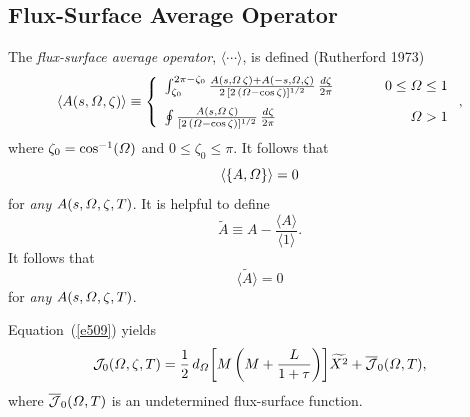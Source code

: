 \documentclass[notitlepage,12pt]{article}
\begin{document}
\subsection{Flux-Surface Average Operator}
The {\em flux-surface average operator}, $\langle\cdots\rangle$, is defined (Rutherford 1973)
\begin{equation}
\langle A(s,{\mit\Omega},\zeta)\rangle
\equiv \left\{
\begin{array}{llr}
\int_{\zeta_0}^{2\pi-\zeta_0}\frac{A(s,{\mit\Omega}\,\zeta)+A(-s,{\mit\Omega},\zeta)}{2\,[2\,({\mit\Omega}-\cos\zeta)]^{1/2}}\,\frac{d\zeta}{2\pi}&~~~~~&0\leq {\mit\Omega}\leq 1\\[2ex]
\oint \frac{A(s,{\mit\Omega}\,\zeta)}{[2\,({\mit\Omega}-\cos\zeta)]^{1/2}}\,\frac{d\zeta}{2\pi}
&&{\mit\Omega}> 1
\end{array}
\right.,
\end{equation}
where $\zeta_0=\cos^{-1}({\mit\Omega})$ and $0\leq\zeta_0\leq\pi$. 
It follows that
\begin{equation}\label{e5111}
\langle\{A,{\mit\Omega}\}\rangle = 0
\end{equation}
for {\em any}\/ $A(s,{\mit\Omega},\zeta,T)$. It is helpful to define
\begin{equation}
\tilde{A}  \equiv A - \frac{\langle A\rangle}{\langle 1\rangle}.
\end{equation}
It follows that 
\begin{equation}\label{e512}
\langle \tilde{A}\rangle =0
\end{equation}
 for {\em any}\/ $A(s,{\mit\Omega},\zeta,T)$.

Equation~(\ref{e509}) yields 
\begin{equation}\label{e513}
{\cal J}_0({\mit\Omega},\zeta,T)= 
\frac{1}{2}\,d_{\mit\Omega}\!\left[M\left(M+\frac{L}{1+\tau}\right)\right]\!\widetilde{X^2} + \overline{\cal J}_0({\mit\Omega},T),
\end{equation}
where $\overline{{\cal J}}_0({\mit\Omega},T)$ is an undetermined flux-surface function. 
\end{document}

